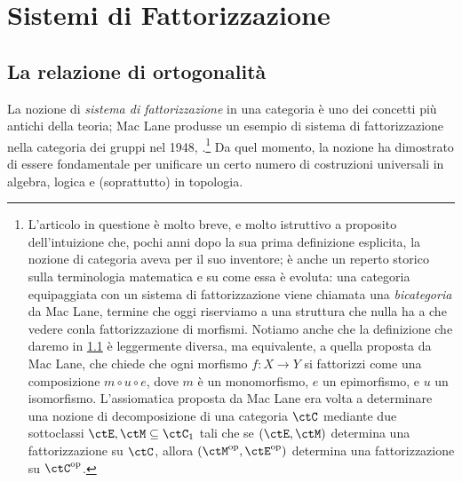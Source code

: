 \label{cap:fattorizzazione}
\chapter{Sistemi di Fattorizzazione}
\section{La relazione di ortogonalità}
La nozione di \emph{sistema di fattorizzazione} in una categoria è uno dei concetti più antichi della teoria; Mac Lane produsse un esempio di sistema di fattorizzazione nella categoria dei gruppi nel 1948, \cite{maclane_grp_duality}.\footnote{L'articolo in questione è molto breve, e molto istruttivo a proposito dell'intuizione che, pochi anni dopo la sua prima definizione esplicita, la nozione di categoria aveva per il suo inventore; è anche un reperto storico sulla terminologia matematica e su come essa è evoluta: una categoria equipaggiata con un sistema di fattorizzazione viene chiamata una \emph{bicategoria} da Mac Lane, termine che oggi riserviamo a una struttura che nulla ha a che vedere conla fattorizzazione di morfismi. Notiamo anche che la definizione che daremo in \ref{} è leggermente diversa, ma equivalente, a quella proposta da Mac Lane, che chiede che ogni morfismo \(f : X\to Y\) si fattorizzi come una composizione \(m\circ u\circ e\), dove \(m\) è un monomorfismo, \(e\) un epimorfismo, e \(u\) un isomorfismo. L'assiomatica proposta da Mac Lane era volta a determinare una nozione di decomposizione di una categoria \(\ctC\) mediante due sottoclassi \(\ctE,\ctM\subseteq\ctC_1\) tali che se \((\ctE,\ctM)\) determina una fattorizzazione su \(\ctC\), allora \((\ctM^\op,\ctE^\op)\) determina una fattorizzazione su \(\ctC^\op\).} Da quel momento, la nozione ha dimostrato di essere fondamentale per unificare un certo numero di costruzioni universali in algebra, logica e (soprattutto) in topologia.

